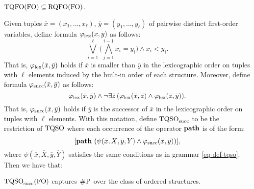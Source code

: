 \begin{theorem} \label{tqfo-subseteq}
	${\rm TQFO}({\rm FO}) \subseteq {\rm RQFO}({\rm FO})$.
\end{theorem}
Given tuples $\bar x = (x_1, \ldots, x_\ell)$, $\bar y = (y_1, \ldots, y_\ell)$ of pairwise distinct first-order variables, define formula $\varphi_{\text{\rm lex}}(\bar x, \bar y)$ as follows:
$$
\bigvee_{i = 1}^\ell \bigg(\bigwedge_{j = 1}^{i -1} x_i = y_i\bigg) \wedge x_i < y_i.
$$
That is, $\varphi_{\text{\rm lex}}(\bar x, \bar y)$ holds if $\bar x$ is smaller than $\bar y$ in the lexicographic order on tuples with $\ell$ elements induced by the built-in order of each structure. Moreover, define formula $\varphi_{\text{\rm succ}}(\bar x, \bar y)$ as follows:
$$
\varphi_{\text{\rm lex}}(\bar x, \bar y) \wedge \neg \exists \bar z \, (\varphi_{\text{\rm lex}}(\bar x, \bar z) \wedge \varphi_{\text{\rm lex}}(\bar z, \bar y)).
$$
That is, $\varphi_{\text{\rm succ}}(\bar x, \bar y)$ holds if $\bar y$ is the successor of $\bar x$ in the lexicographic order on tuples with $\ell$ elements.
With this notation, define ${\rm TQSO}_{\rm succ}$ to be the restriction of ${\rm TQSO}$ where each occurrence of the operator ${\bf path}$ is of the form:
$$
[{\bf path} \,\, (\psi(\bar{x}, \bar{X},\bar{y}, \bar{Y}) \wedge \varphi_{\text{\rm succ}}(\bar x, \bar y))],
$$
where $\psi(\bar{x}, \bar{X},\bar{y}, \bar{Y})$ satisfies the same conditions as in grammar \eqref{eq-def-tqso}. Then we have that:
\begin{theorem} \label{tqsos-shp}
	${\rm TQSO}_{\rm succ}({\rm FO})$ captures $\text{\sc \#P}$ over the class of ordered structures.
\end{theorem}

%



